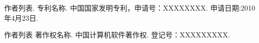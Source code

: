 \begin{patent}
\item 作者列表. 专利名称. 中国国家发明专利，申请号：XXXXXXXX. 申请日期:2010年4月23日.
\item 作者列表 著作权名称. 中国计算机软件著作权. 登记号：XXXXXXXXX.
\end{patent} 